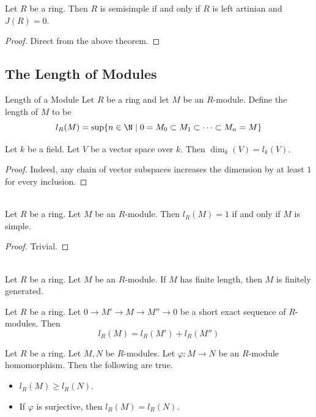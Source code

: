 \documentclass[a4paper]{article}
\begin{document}
\begin{crl}{}{} Let $R$ be a ring. Then $R$ is semisimple if and only if $R$ is left artinian and $J(R)=0$. 
\begin{proof}
Direct from the above theorem. 
\end{proof}
\end{crl}

\subsection{The Length of Modules}
\begin{defn}{Length of a Module}{} Let $R$ be a ring and let $M$ be an $R$-module. Define the length of $M$ to be $$l_R(M)=\text{sup}\{n\in\N\;|\;0=M_0\subset M_1\subset\cdots\subset M_n=M\}$$
\end{defn}

\begin{eg}{}{} Let $k$ be a field. Let $V$ be a vector space over $k$. Then $\dim_k(V)=l_k(V)$. 
\begin{proof}
Indeed, any chain of vector subspaces increases the dimension by at least $1$ for every inclusion. 
\end{proof}
\end{eg}

\begin{lmm}{}{}\\
Let $R$ be a ring. Let $M$ be an $R$-module. Then $l_R(M)=1$ if and only if $M$ is simple. 
\begin{proof}
Trivial. 
\end{proof}
\end{lmm}

\begin{prp}{}{}\\
Let $R$ be a ring. Let $M$ be an $R$-module. If $M$ has finite length, then $M$ is finitely generated. 
\end{prp}

\begin{prp}{}{} Let $R$ be a ring. Let $0\to M'\to M\to M''\to 0$ be a short exact sequence of $R$-modules. Then $$l_R(M)=l_R(M')+l_R(M'')$$
\end{prp}

\begin{prp}{}{} Let $R$ be a ring. Let $M,N$ be $R$-modules. Let $\varphi:M\to N$ be an $R$-module homomorphism. Then the following are true. 
\begin{itemize}
\item $l_R(M)\geq l_R(N)$. 
\item If $\varphi$ is surjective, then $l_R(M)=l_R(N)$. 
\end{itemize}
\end{prp}
\end{document}
